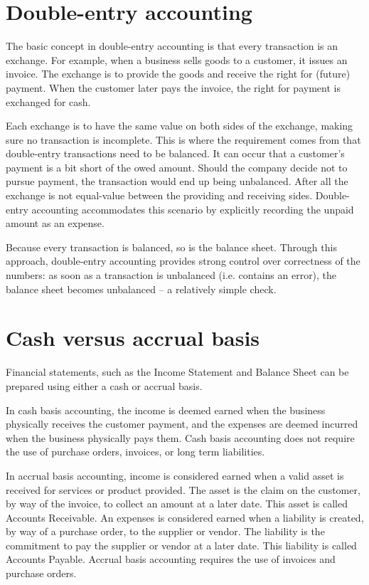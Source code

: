 \section{Double-entry accounting}
\label{sec-accounting-double-entry}

The basic concept in double-entry accounting is that every transaction is an exchange. For example, when a business
sells goods to a customer, it issues an invoice.
The exchange is to provide the goods and receive the right for (future) payment. When the customer later pays the invoice, the right for payment is exchanged for cash.

Each exchange is to have the same value on both sides of the exchange, making sure no transaction is incomplete. This is where
the requirement comes from that double-entry transactions need
to be balanced.  It can occur that a customer's payment is a bit short of the owed amount.  Should the company decide not to pursue payment, the transaction would end up being unbalanced. After all the exchange is not equal-value between the providing and receiving sides. Double-entry accounting accommodates this scenario by explicitly recording the unpaid amount as an expense.

Because every transaction is balanced, so is the balance sheet. Through this approach, double-entry accounting provides strong
control over correctness of the numbers: as soon as a transaction
is unbalanced (i.e. contains an error), the balance sheet becomes unbalanced -- a relatively simple check.

\section{Cash versus accrual basis}
\label{sec-accounting-cash-vs-accrual}

Financial statements, such as the Income Statement and Balance Sheet can be prepared using either a cash or accrual basis.

In \gls{cash basis} accounting, the income is deemed earned when the business physically
receives the customer payment, and the expenses are deemed incurred when the business
physically pays them. Cash basis accounting does not require the use of purchase orders,
invoices, or long term liabilities.

In \gls{accrual basis} accounting, income is considered earned when a valid asset is
received for services or product provided. The asset is the claim on the customer,
by way of the invoice, to collect an amount at a later date. This asset is called
Accounts Receivable. An expenses is considered earned when a liability is created,
by way of a purchase order, to the supplier or vendor. The liability is the commitment
to pay the supplier or vendor at a later date. This liability is called Accounts Payable.
Accrual basis accounting requires the use of invoices and purchase orders.

